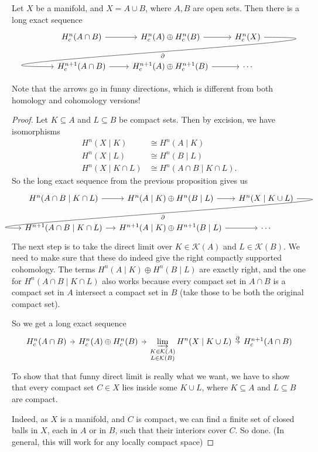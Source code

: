 \documentclass[a4paper]{article}
\theoremstyle{definition}
\begin{document}
\begin{cor}
  Let $X$ be a manifold, and $X = A \cup B$, where $A, B$ are open sets. Then there is a long exact sequence
  \[
    \begin{tikzcd}
      H^n_c(A \cap B) \ar[r] & H^n_c(A) \oplus H^n_c(B) \ar[r] & H_c^n(X)\ar[out=0, in=180, looseness=2, overlay, lld, "\partial"]\\
      H_c^{n+1}(A \cap B) \ar[r] & H_c^{n+1}(A) \oplus H_c^{n+1}(B) \ar[r] & \cdots
    \end{tikzcd}
  \]
\end{cor}
Note that the arrows go in funny directions, which is different from both homology and cohomology versions!

\begin{proof}
  Let $K \subseteq A$ and $L \subseteq B$ be compact sets. Then by excision, we have isomorphisms
  \begin{align*}
    H^n(X \mid K) &\cong H^n(A \mid K)\\
    H^n(X \mid L) &\cong H^n(B \mid L)\\
    H^n(X \mid K \cap L) &\cong H^n(A \cap B \mid K\cap L).
  \end{align*}
  So the long exact sequence from the previous proposition gives us
  \[
    \begin{tikzcd}[column sep=small]
      H^n(A \cap B\mid K \cap L) \ar[r] & H^n(A \mid K) \oplus H^n(B \mid L) \ar[r] & H^n(X \mid K \cup L) \ar[lld, out=0, in=180, overlay, "\partial"]\\
      H^{n + 1}(A \cap B \mid K \cap L) \ar[r] & H^{n + 1}(A \mid K) \oplus H^{n + 1}(B \mid L) \ar[r] & \cdots
    \end{tikzcd}
  \]
  The next step is to take the direct limit over $K \in \mathcal{K}(A)$ and $L \in \mathcal{K}(B)$. We need to make sure that these do indeed give the right compactly supported cohomology. The terms $H^n(A \mid K) \oplus H^n (B \mid L)$ are exactly right, and the one for $H^n(A \cap B \mid K \cap L)$ also works because every compact set in $A \cap B$ is a compact set in $A$ intersect a compact set in $B$ (take those to be both the original compact set).

  So we get a long exact sequence
  \[
    \begin{tikzcd}[column sep=tiny]
      H^n_c(A \cap B) \ar[r] & H^n_c(A) \oplus H^n_c(B) \ar[r] & \displaystyle\varinjlim_{\substack{K \in \mathcal{K}(A)\\ L \in \mathcal{K}(B)}} H^n(X \mid K \cup L) \ar[r, "\partial"] & H^{n + 1}_c(A \cap B)
    \end{tikzcd}
  \]
  To show that that funny direct limit is really what we want, we have to show that every compact set $C \in X$ lies inside some $K \cup L$, where $K \subseteq A$ and $L \subseteq B$ are compact.

  Indeed, as $X$ is a manifold, and $C$ is compact, we can find a finite set of closed balls in $X$, each in $A$ or in $B$, such that their interiors cover $C$. So done. (In general, this will work for any locally compact space)
\end{proof}
\end{document}

